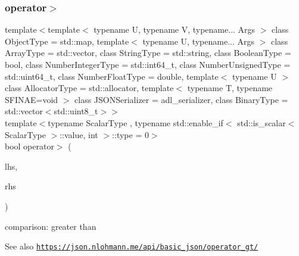 \subsubsection{\texorpdfstring{operator$>$}{operator>}\hspace{0.1cm}{\footnotesize\ttfamily [2/3]}}
{\footnotesize\ttfamily template$<$template$<$ typename U, typename V, typename... Args $>$ class Object\+Type = std\+::map, template$<$ typename U, typename... Args $>$ class Array\+Type = std\+::vector, class String\+Type  = std\+::string, class Boolean\+Type  = bool, class Number\+Integer\+Type  = std\+::int64\+\_\+t, class Number\+Unsigned\+Type  = std\+::uint64\+\_\+t, class Number\+Float\+Type  = double, template$<$ typename U $>$ class Allocator\+Type = std\+::allocator, template$<$ typename T, typename S\+F\+I\+N\+A\+E=void $>$ class J\+S\+O\+N\+Serializer = adl\+\_\+serializer, class Binary\+Type  = std\+::vector$<$std\+::uint8\+\_\+t$>$$>$ \\
template$<$typename Scalar\+Type , typename std\+::enable\+\_\+if$<$ std\+::is\+\_\+scalar$<$ Scalar\+Type $>$\+::value, int $>$\+::type  = 0$>$ \\
bool operator$>$ (\begin{DoxyParamCaption}\item[{\hyperlink{classnlohmann_1_1basic__json_ab8a1c33ee7b154fc41ca2545aa9724e6}{const\+\_\+reference}}]{lhs,  }\item[{Scalar\+Type}]{rhs }\end{DoxyParamCaption})\hspace{0.3cm}{\ttfamily [friend]}}



comparison\+: greater than 

\begin{DoxySeeAlso}{See also}
\href{https://json.nlohmann.me/api/basic_json/operator_gt/}{\tt https\+://json.\+nlohmann.\+me/api/basic\+\_\+json/operator\+\_\+gt/} 
\end{DoxySeeAlso}
\mbox{\label{classnlohmann_1_1basic__json_a67771044f08fd07105b34667615d9e0e}} 
